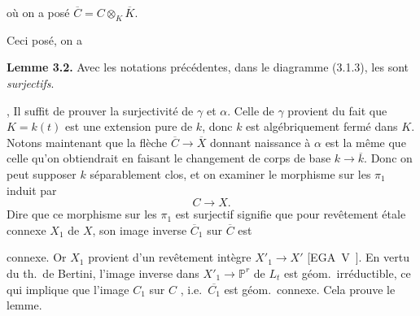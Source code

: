\documentclass[11pt,a4paper]{article}
\begin{document}

où on a posé $\overline{C} = C \otimes_K \overline{K}$. 

Ceci posé, on a

\textbf{Lemme 3.2.} Avec les  notations précédentes, dans le diagramme (3.1.3), les   \struck{\ill{}}  \struck{$\alpha$ \ill{} \ill{}} sont \emph{surjectifs}.

, Il suffit de prouver la surjectivité de $\gamma$ et $\alpha$. Celle de $\gamma$ provient du fait que $K = k(t)$ est une extension  pure de $k$, donc \struck{\ill{}} $k$ est algébriquement fermé dans $K$. Notons maintenant que la flèche $\overline{C} \to \overline{X}$ donnant naissance à $\alpha$ est la même que celle qu'on obtiendrait en  faisant le changement de corps de base $k \to \overline{k}$. Donc on peut supposer $k$ séparablement clos, et \struck{\ill{}} on   examiner le morphisme sur les $\pi_1$ induit par
\[
  C \to X .
\]
Dire que ce morphisme sur les $\pi_1$ est surjectif signifie que pour  revêtement étale connexe $X_1$ de $X$, son image inverse $\overline{C}_1$ sur $\overline{C}$ est

connexe.  Or $X_1$ provient d'un revêtement   intègre \struck{\ill{}} $X'_1 \to X'$ [EGA~V~\ill{}]. En vertu du th.\ de Bertini, l'image inverse \struck{\ill{}} dans $X'_1 \to \mathbb{P}^r$ \struck{\ill{}} de $L_t$ est  géom.\ irréductible, ce qui implique que l'image $C_1$  sur $C$ , i.e.\ $\overline{C_1}$ est géom.\ connexe. Cela prouve le lemme.
\end{document}
